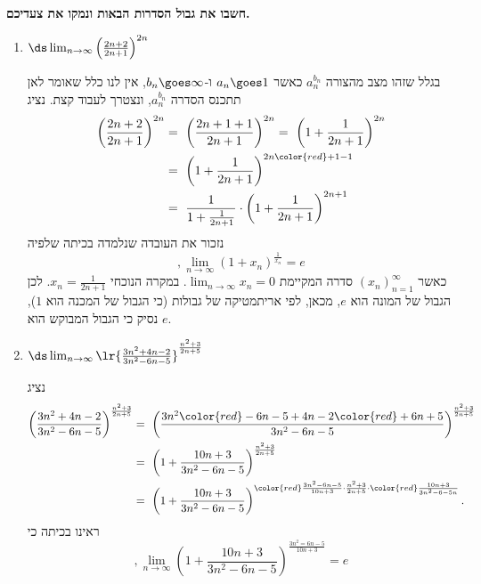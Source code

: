 \textbf{חשבו את גבול הסדרות הבאות ונמקו את צעדיכם.}
\begin{enumerate}
\item $\ds\lim_{n \to \infty} \left( \frac{2n + 2}{2n + 1} \right)^{2n}$
\begin{solbox}
בגלל שזהו מצב מהצורה
$a_n^{b_n}$
כאשר
$a_n\goes 1$
ו-$b_n\goes\infty$,
אין לנו כלל שאומר לאן תתכנס הסדרה
$a_n^{b_n}$,
ונצטרך לעבוד קצת.
נציג
\begin{align*}
    \left( \frac{2n + 2}{2n + 1} \right)^{2n}&=\
    \left( \frac{2n + 1+1}{2n + 1} \right)^{2n}=\
    \left(1+ \frac{1}{2n + 1} \right)^{2n}\\
    &=\ \left(1+ \frac{1}{2n + 1} \right)^{2n{\color{red}+1-1}}\\
    &=\ \frac{1}{1+ \frac{1}{2n + 1}}\cdot\left(1+ \frac{1}{2n + 1} \right)^{2n+1}
\end{align*}
נזכור את העובדה שנלמדה בכיתה שלפיה
$$,\lim_{n\to\infty}(1+x_n)^{\frac{1}{x_n}}=e$$
כאשר
$(x_n)_{n=1}^\infty$
סדרה המקיימת
$\displaystyle\lim_{n\to\infty}x_n=0$.
במקרה הנוכחי
$x_n=\frac{1}{2n+1}$.
לכן הגבול של המונה הוא
$e$,
מכאן,
לפי אריתמטיקה של גבולות (כי הגבול של המכנה הוא
$1$), נסיק כי הגבול המבוקש הוא
$e$.
\end{solbox}
\item $\ds\lim_{n \to \infty} \lr{\frac{3n^2+4n-2}{3n^2-6n-5}}^{\frac{n^2+3}{2n+5}}$
\begin{solbox}
נציג
\begin{align*}
    \left(\frac{3n^2+4n-2}{3n^2-6n-5}\right)^{\frac{n^2+3}{2n+5}}&=\ \left(\frac{3n^2{\color{red}-6n-5}+4n-2{\color{red}+6n+5}}{3n^2-6n-5}\right)^{\frac{n^2+3}{2n+5}}\\
    &=\ \left(1+\frac{10n+3}{3n^2-6n-5}\right)^{\frac{n^2+3}{2n+5}}\\
    &=\ \left(1+\frac{10n+3}{3n^2-6n-5}\right)^{{\color{red}\frac{3n^2-6n-5}{10n+3}}\cdot\frac{n^2+3}{2n+5}\cdot{\color{red}\frac{10n+3}{3n^2-6-5n}}}.
\end{align*}
ראינו בכיתה כי
$$,\displaystyle\lim_{n\to\infty}\left(1+\frac{10n+3}{3n^2-6n-5}\right)^{\frac{3n^2=6n-5}{10n+3}}=e$$

\end{solbox}
\end{enumerate}
